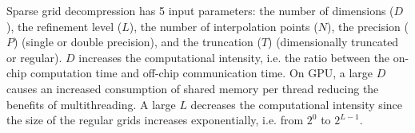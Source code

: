Sparse grid decompression has 5 input parameters: the number of dimensions
($D$), the refinement level ($L$), the number of interpolation points ($N$), the
precision ($P$) (single or double precision), and the truncation ($T$)
(dimensionally truncated or regular). $D$ increases the computational intensity, 
i.e. the ratio between the on-chip
computation time and off-chip communication time. On GPU, a large $D$ causes an
increased consumption of shared memory per thread reducing the benefits of
multithreading. A large $L$ decreases the computational intensity since the size
of the regular grids increases exponentially, i.e. from $2^0$ to $2^{L-1}$. 